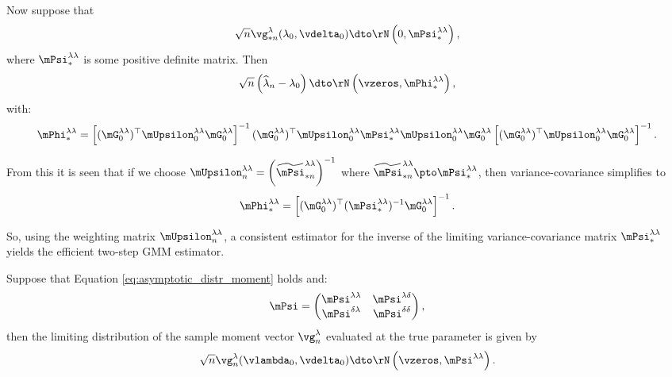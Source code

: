 \documentclass[english,12pt]{book}\usepackage[]{graphicx}\usepackage[]{xcolor}
\begin{document}
Now suppose that 
\begin{equation*}
\sqrt{n}\vg_{*n}^{\lambda}(\lambda_0, \vdelta_0) \dto \rN\left(0, \mPsi^{\lambda\lambda}_{*}\right), 
\end{equation*}
%
where $\mPsi^{\lambda\lambda}_{*}$ is some positive definite matrix. Then
\begin{equation*}
\sqrt{n}\left(\widehat{\lambda}_n - \lambda_0\right)\dto \rN\left(\vzeros, \mPhi_{*}^{\lambda\lambda}\right),
\end{equation*}
%
with:
\begin{equation*}
\mPhi_{*}^{\lambda\lambda} = \left[(\mG^{\lambda\lambda}_0)^\top\mUpsilon^{\lambda\lambda}_0\mG^{\lambda\lambda}_0\right]^{-1}(\mG^{\lambda\lambda}_0)^\top\mUpsilon^{\lambda\lambda}_0\mPsi_{*}^{\lambda\lambda}\mUpsilon^{\lambda\lambda}_0\mG^{\lambda\lambda}_0\left[(\mG^{\lambda\lambda}_0)^\top\mUpsilon^{\lambda\lambda}_0\mG^{\lambda\lambda}_0\right]^{-1}.
\end{equation*}

From this it is seen that if we choose $\mUpsilon_n^{\lambda\lambda} = \left(\widetilde{\mPsi}_{*n}^{\lambda\lambda}\right)^{-1}$ where $\widetilde{\mPsi}_{*n}^{\lambda\lambda}\pto \mPsi_{*}^{\lambda\lambda}$, then variance-covariance simplifies to
\begin{equation*}
\mPhi_{*}^{\lambda\lambda} = \left[(\mG^{\lambda\lambda}_0)^\top(\mPsi^{\lambda\lambda}_{*})^{-1}\mG^{\lambda\lambda}_0\right]^{-1}.
\end{equation*}

So, using the weighting matrix $\mUpsilon_n^{\lambda\lambda}$, a consistent estimator for the inverse of the limiting variance-covariance matrix $\mPsi_{*}^{\lambda\lambda}$ yields the efficient two-step GMM estimator.

Suppose that Equation \eqref{eq:asymptotic_distr_moment} holds and:
\begin{equation*}
	\mPsi = \begin{pmatrix}
	\mPsi^{\lambda\lambda} & \mPsi^{\lambda\delta} \\
	\mPsi^{\delta\lambda} & \mPsi^{\delta\delta}
	\end{pmatrix},
\end{equation*}
%
then the limiting distribution of the sample moment vector $\vg_n^{\lambda}$ evaluated at the true parameter is given by
\begin{equation*}
\sqrt{n}\vg_{n}^{\lambda}(\vlambda_0, \vdelta_0)\dto \rN\left(\vzeros, \mPsi^{\lambda\lambda}\right).
\end{equation*}
\end{document}
